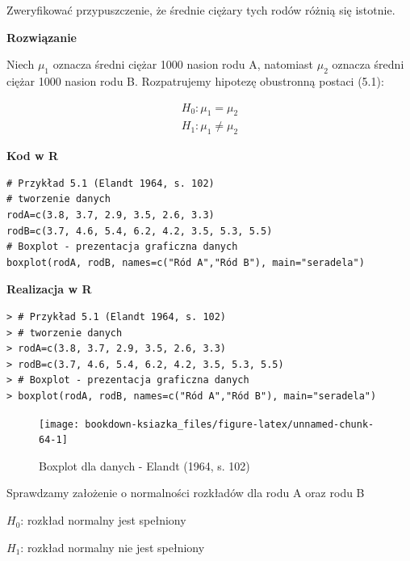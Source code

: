 \documentclass[12pt,B5paper,]{book}
\begin{document}
Zweryfikować przypuszczenie, że średnie ciężary tych rodów różnią się
istotnie.

\vspace{0.8cm} \textbf{Rozwiązanie}

Niech \(\mu_1\) oznacza średni ciężar 1000 nasion rodu A, natomiast
\(\mu_2\) oznacza średni ciężar 1000 nasion rodu B. Rozpatrujemy
hipotezę obustronną postaci (5.1):

\vspace{-0.6cm}

\begin{align*}
        H_0: \mu_1 = \mu_2 \\
        H_1: \mu_1 \neq \mu_2
\end{align*}

\vspace{0.8cm} \textbf{Kod w R}

\begin{verbatim}
# Przykład 5.1 (Elandt 1964, s. 102)
# tworzenie danych
rodA=c(3.8, 3.7, 2.9, 3.5, 2.6, 3.3)
rodB=c(3.7, 4.6, 5.4, 6.2, 4.2, 3.5, 5.3, 5.5)
# Boxplot - prezentacja graficzna danych
boxplot(rodA, rodB, names=c("Ród A","Ród B"), main="seradela")
\end{verbatim}

\vspace{0.8cm} \textbf{Realizacja w R}

\begin{verbatim}
> # Przykład 5.1 (Elandt 1964, s. 102)
> # tworzenie danych
> rodA=c(3.8, 3.7, 2.9, 3.5, 2.6, 3.3)
> rodB=c(3.7, 4.6, 5.4, 6.2, 4.2, 3.5, 5.3, 5.5)
> # Boxplot - prezentacja graficzna danych
> boxplot(rodA, rodB, names=c("Ród A","Ród B"), main="seradela")
\end{verbatim}

\begin{figure}[H]

{\centering \texttt{[image: bookdown-ksiazka\_files/figure-latex/unnamed-chunk-64-1]} 

}

\caption{Boxplot dla danych - Elandt (1964, s. 102)}\label{fig:unnamed-chunk-64}
\end{figure}

Sprawdzamy założenie o normalności rozkładów dla rodu A oraz rodu B

\hspace*{5cm} \(H_0\): rozkład normalny jest spełniony

\hspace*{5cm} \(H_1\): rozkład normalny nie jest spełniony
\end{document}
